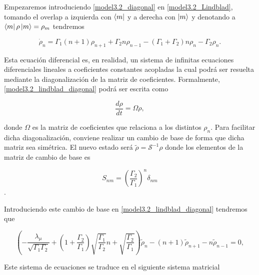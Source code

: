 \documentclass{report} %
\numberwithin{equation}{section}
\begin{document}
Empezaremos introduciendo \eqref{model3.2_diagonal} en \eqref{model3.2_Lindblad}, tomando el overlap a izquierda con $\bra{m}$ y a derecha con $\ket{m}$ y denotando a $\bra{m}\rho\ket{m} = \rho_{m}$ tendremos 

\begin{equation}
    \dot{\rho}_n = \Gamma_1 (n+1) \rho_{n+1} + \Gamma_2 n \rho_{n-1} - (\Gamma_1 + \Gamma_2)n \rho_n - \Gamma_2 \rho_n.
    \label{model3.2_lindblad_diagonal}
\end{equation}

Esta ecuación diferencial es, en realidad, un sistema de infinitas ecuaciones diferenciales lineales a coeficientes constantes acopladas la cual podrá ser resuelta mediante la diagonalización de la matriz de coeficientes. Formalmente, \eqref{model3.2_lindblad_diagonal} podrá ser escrita como

\begin{equation*}
    \frac{d\rho}{dt} = \Omega \rho,
\end{equation*}

donde ${\Omega} $ es la matriz de coeficientes que relaciona a los distintos $\rho_{n}$. Para facilitar dicha diagonalización, conviene realizar un cambio de base de forma que dicha matriz sea simétrica. El nuevo estado será $\tilde{\rho} = \mathcal{S}^{-1} \rho$ donde los elementos de la matriz de cambio de base es

$$S_{nm} = \left(\frac{\Gamma_2}{\Gamma_1}\right)^{n} \delta_{nm}$$.

Introduciendo este cambio de base en \eqref{model3.2_lindblad_diagonal} tendremos que 


\begin{equation}
    \left(-\frac{\lambda_\mu}{\sqrt{\Gamma_1 \Gamma_2}} + \left(1+\frac{\Gamma_2}{\Gamma_1}\right)\sqrt{\frac{\Gamma_1}{\Gamma_2}} n + \sqrt{\frac{\Gamma_2}{\Gamma_1}}\right) \tilde{\rho}_n - (n+1)\tilde{\rho}_{n+1} - n\tilde{\rho}_{n-1} = 0,
\end{equation}

Este sistema de ecuaciones se traduce en el siguiente sistema matricial
\end{document}
